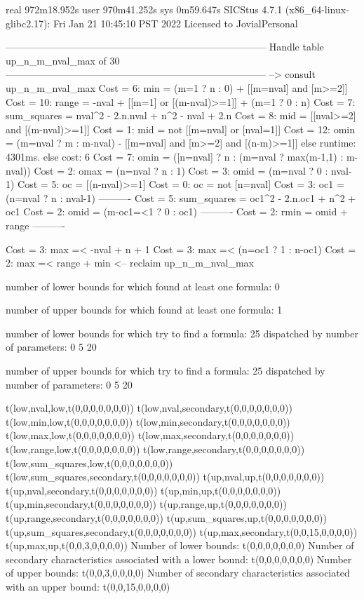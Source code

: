 real	972m18.952s
user	970m41.252s
sys	0m59.647s
SICStus 4.7.1 (x86_64-linux-glibc2.17): Fri Jan 21 10:45:10 PST 2022
Licensed to JovialPersonal


--------------------------------------------------------------------------------
Handle table up_n_m_nval_max of 30
--------------------------------------------------------------------------------
--> consult up_n_m_nval_max
Cost =  6:  min         = (m=1 ? n : 0) + [[m=nval] and [m>=2]] %
Cost = 10:  range       = -nval + [[m=1] or [(m-nval)>=1]] + (m=1 ? 0 : n) %
Cost =  7:  sum_squares = nval^2 - 2.n.nval + n^2 - nval + 2.n
Cost =  8:  mid         = [[nval>=2] and [(m-nval)>=1]]
Cost =  1:  mid         = not [[m=nval] or [nval=1]]
Cost = 12:  omin        = (m=nval ? m : m-nval) - [[m=nval] and [m>=2] and [(n-m)>=1]] %
else runtime: 4301ms. else cost: 6
Cost =  7:  omin        = ([n=nval] ? n : (m=nval ? max(m-1,1) : m-nval)) %
Cost =  2:  omax        = (n=nval ? n : 1)
Cost =  3:  omid        = (m=nval ? 0 : nval-1)
Cost =  5:  oc          = [(n-nval)>=1]
Cost =  0:  oc          = not [n=nval]
Cost =  3:  oc1         = (n=nval ? n : nval-1)
----------
Cost =  5:  sum_squares = oc1^2 - 2.n.oc1 + n^2 + oc1
Cost =  2:  omid        = (m-oc1=<1 ? 0 : oc1)
----------
Cost =  2:  rmin        = omid + range
----------

Cost =  3:  max =< -nval + n + 1
Cost =  3:  max =< (n=oc1 ? 1 : n-oc1)
Cost =  2:  max =< range + min
<-- reclaim up_n_m_nval_max

number of lower bounds for which found at least one formula: 0

number of upper bounds for which found at least one formula: 1

number of lower bounds for which try to find a formula: 25
dispatched by number of parameters: 0  5  20

number of upper bounds for which try to find a formula: 25
dispatched by number of parameters: 0  5  20

t(low,nval,low,t(0,0,0,0,0,0,0))
t(low,nval,secondary,t(0,0,0,0,0,0,0))
t(low,min,low,t(0,0,0,0,0,0,0))
t(low,min,secondary,t(0,0,0,0,0,0,0))
t(low,max,low,t(0,0,0,0,0,0,0))
t(low,max,secondary,t(0,0,0,0,0,0,0))
t(low,range,low,t(0,0,0,0,0,0,0))
t(low,range,secondary,t(0,0,0,0,0,0,0))
t(low,sum_squares,low,t(0,0,0,0,0,0,0))
t(low,sum_squares,secondary,t(0,0,0,0,0,0,0))
t(up,nval,up,t(0,0,0,0,0,0,0))
t(up,nval,secondary,t(0,0,0,0,0,0,0))
t(up,min,up,t(0,0,0,0,0,0,0))
t(up,min,secondary,t(0,0,0,0,0,0,0))
t(up,range,up,t(0,0,0,0,0,0,0))
t(up,range,secondary,t(0,0,0,0,0,0,0))
t(up,sum_squares,up,t(0,0,0,0,0,0,0))
t(up,sum_squares,secondary,t(0,0,0,0,0,0,0))
t(up,max,secondary,t(0,0,15,0,0,0,0))
t(up,max,up,t(0,0,3,0,0,0,0))
Number of lower bounds:                                             t(0,0,0,0,0,0,0)
Number of secondary characteristics associated with a lower bound:  t(0,0,0,0,0,0,0)
Number of upper bounds:                                             t(0,0,3,0,0,0,0)
Number of secondary characteristics associated with an upper bound: t(0,0,15,0,0,0,0)

